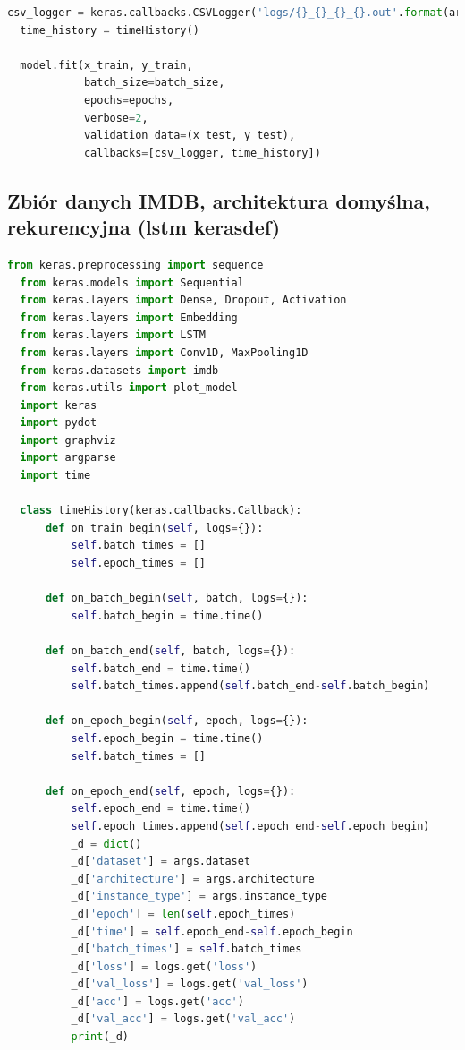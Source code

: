 \documentclass[12pt,a4paper,twoside]{article}
\begin{document}
\begin{appendices}
\begin{lstlisting}[language=python]
  csv_logger = keras.callbacks.CSVLogger('logs/{}_{}_{}_{}.out'.format(args.run_date, args.dataset, args.architecture, args.instance_type))
  time_history = timeHistory()

  model.fit(x_train, y_train,
            batch_size=batch_size,
            epochs=epochs,
            verbose=2,
            validation_data=(x_test, y_test),
            callbacks=[csv_logger, time_history])
\end{lstlisting}
\clearpage
\subsection{Zbiór danych IMDB, architektura domyślna, rekurencyjna (lstm kerasdef)}
\begin{lstlisting}[language=python]
  from keras.preprocessing import sequence
  from keras.models import Sequential
  from keras.layers import Dense, Dropout, Activation
  from keras.layers import Embedding
  from keras.layers import LSTM
  from keras.layers import Conv1D, MaxPooling1D
  from keras.datasets import imdb
  from keras.utils import plot_model
  import keras
  import pydot
  import graphviz
  import argparse
  import time

  class timeHistory(keras.callbacks.Callback):
      def on_train_begin(self, logs={}):
          self.batch_times = []
          self.epoch_times = []

      def on_batch_begin(self, batch, logs={}):
          self.batch_begin = time.time()

      def on_batch_end(self, batch, logs={}):
          self.batch_end = time.time()
          self.batch_times.append(self.batch_end-self.batch_begin)

      def on_epoch_begin(self, epoch, logs={}):
          self.epoch_begin = time.time()
          self.batch_times = []

      def on_epoch_end(self, epoch, logs={}):
          self.epoch_end = time.time()
          self.epoch_times.append(self.epoch_end-self.epoch_begin)
          _d = dict()
          _d['dataset'] = args.dataset
          _d['architecture'] = args.architecture
          _d['instance_type'] = args.instance_type
          _d['epoch'] = len(self.epoch_times)
          _d['time'] = self.epoch_end-self.epoch_begin
          _d['batch_times'] = self.batch_times
          _d['loss'] = logs.get('loss')
          _d['val_loss'] = logs.get('val_loss')
          _d['acc'] = logs.get('acc')
          _d['val_acc'] = logs.get('val_acc')
          print(_d)


\end{lstlisting}
\end{appendices}
\end{document}
